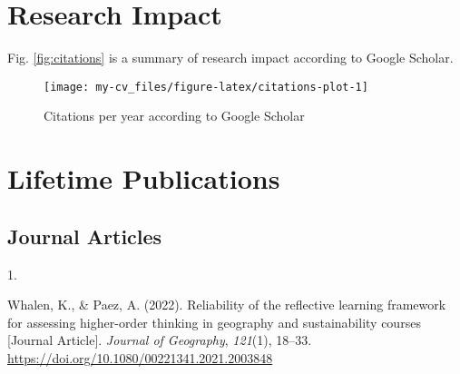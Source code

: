 \documentclass[11pt,a4paper,]{awesome-cv}
\newlength{\csllabelwidth}
\newcommand{\CSLLeftMargin}[1]{\parbox[t]{\csllabelwidth}{#1}}
\newcommand{\CSLRightInline}[1]{\parbox[t]{\linewidth - \csllabelwidth}{#1}}
\begin{document}
\begin{cventries}
\end{cventries}

\hypertarget{research-impact}{%
\section{Research Impact}\label{research-impact}}

Fig. \ref{fig:citations} is a summary of research impact according to
Google Scholar.

\begin{figure}

{\centering \texttt{[image: my-cv\_files/figure-latex/citations-plot-1]} 

}

\caption{\label{fig:citations}Citations per year according to Google Scholar}\label{fig:citations-plot}
\end{figure}

\hypertarget{lifetime-publications}{%
\section{Lifetime Publications}\label{lifetime-publications}}

\hypertarget{journal-articles}{%
\subsection{Journal Articles}\label{journal-articles}}

\hypertarget{bibliography}{}
\leavevmode{}%
\CSLLeftMargin{1. }
\CSLRightInline{Whalen, K., \& Paez, A. (2022). Reliability of the
reflective learning framework for assessing higher-order thinking in
geography and sustainability courses {[}Journal Article{]}.
\emph{Journal of Geography}, \emph{121}(1), 18--33.
\url{https://doi.org/10.1080/00221341.2021.2003848}}
\end{document}

